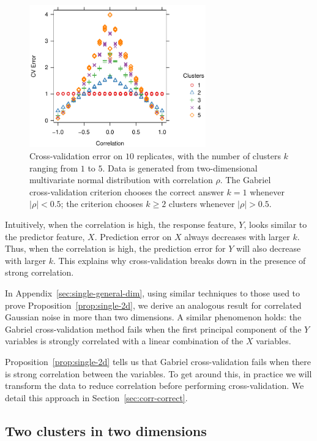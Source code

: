 \documentclass[12pt]{article}
\begin{document}
\begin{figure}
\centering
\includegraphics[width=3in]{demo/nullcorr/equal.pdf}
\caption{Cross-validation error on $10$ replicates, with the number of
clusters $k$ ranging from $1$ to $5$.  Data is generated from two-dimensional
multivariate normal distribution with correlation $\rho$.  The Gabriel
cross-validation criterion chooses the correct answer $k = 1$ whenever
$|\rho| < 0.5$; the criterion chooses $k \geq 2$ clusters whenever $|\rho| > 0.5$.}
\label{fig:nullcorr-equal}
\end{figure}


Intuitively, when the correlation is high, the response feature, $Y$, looks
similar to the predictor feature, $X$. Prediction error on $X$ always
decreases with larger $k$. Thus, when the correlation is high, the prediction
error for $Y$ will also decrease with larger $k$. This explains why
cross-validation breaks down in the presence of strong correlation.


In Appendix~\ref{sec:single-general-dim}, using similar techniques to those used
to prove Proposition~\ref{prop:single-2d}, we derive an analogous result for correlated
Gaussian noise in more than two dimensions. A similar phenomenon holds:
the Gabriel cross-validation method fails when the first principal component
of the $Y$ variables is strongly correlated with a linear combination of the
$X$ variables.


Proposition~\ref{prop:single-2d} tells us that Gabriel cross-validation fails
when there is strong correlation between the variables. To get around this, in
practice we will transform the data to reduce correlation before performing
cross-validation. We detail this approach in Section~\ref{sec:corr-correct}.


\subsection{Two clusters in two dimensions}
\end{document}
